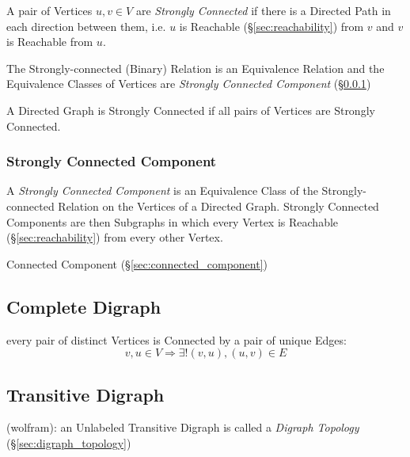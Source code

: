 A pair of Vertices $u,v \in V$ are \emph{Strongly Connected} if there
is a Directed Path in each direction between them, i.e. $u$ is
Reachable (\S\ref{sec:reachability}) from $v$ and $v$ is Reachable
from $u$.

The Strongly-connected (Binary) Relation is an Equivalence Relation
and the Equivalence Classes of Vertices are \emph{Strongly Connected
  Component} (\S\ref{sec:strongly_connected_component})

A Directed Graph is Strongly Connected if all pairs of Vertices are
Strongly Connected.



\subsubsection{Strongly Connected Component}
\label{sec:strongly_connected_component}

A \emph{Strongly Connected Component} is an Equivalence Class of the
Strongly-connected Relation on the Vertices of a Directed Graph.
Strongly Connected Components are then Subgraphs in which every Vertex
is Reachable (\S\ref{sec:reachability}) from every other Vertex.

Connected Component (\S\ref{sec:connected_component})



\subsection{Complete Digraph}\label{sec:complete_digraph}

every pair of distinct Vertices is Connected by a pair of unique
Edges:
\[
  v,u \in V \Rightarrow \exists! (v,u), (u,v) \in E
\]



\subsection{Transitive Digraph}\label{sec:transitive_digraph}

(wolfram): an Unlabeled Transitive Digraph is called a \emph{Digraph Topology}
(\S\ref{sec:digraph_topology})



